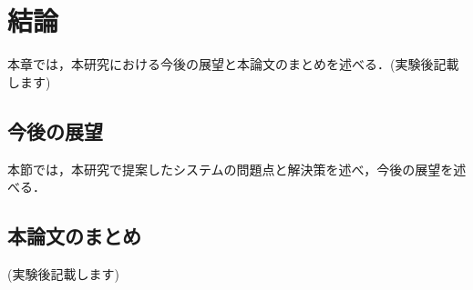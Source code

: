 \chapter{結論}
本章では，本研究における今後の展望と本論文のまとめを述べる．(実験後記載します)

\section{今後の展望}
本節では，本研究で提案したシステムの問題点と解決策を述べ，今後の展望を述べる．
\section{本論文のまとめ}
(実験後記載します)